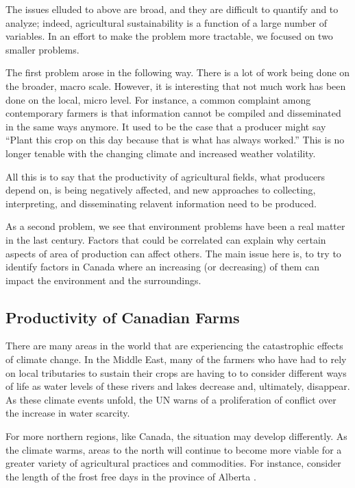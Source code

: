 \documentclass[11pt]{article}
\numberwithin{equation}{section}
\begin{document}
The issues elluded to above are broad, and they are difficult to quantify and to analyze; indeed, agricultural sustainability is a function of a large number of variables. In an effort to make the problem more tractable, we focused on two smaller problems.

The first problem arose in the following way. There is a lot of work being done on the broader, macro scale. However, it is interesting that not much work has been done on the local, micro level. For instance, a common complaint among contemporary farmers is that information cannot be compiled and disseminated in the same ways anymore. It used to be the case that a producer might say ``Plant this crop on this day because that is what has always worked.'' This is no longer tenable with the changing climate and increased weather volatility.

All this is to say that the productivity of agricultural fields, what producers depend on, is being negatively affected, and new approaches to collecting, interpreting, and disseminating relavent information need to be produced.

As a second problem, we see that environment problems  have been a real matter in the last century. Factors that could be correlated can explain why certain aspects of area of production can affect others. The main issue here is,  to try to identify  factors in  Canada where an increasing (or decreasing) of them can  impact the environment and the surroundings. 


\subsection{Productivity of Canadian Farms}\label{productivity}

There are many areas in the world that are experiencing the catastrophic effects of climate change. In the Middle East, many of the farmers who have had to rely on local tributaries to sustain their crops are having to to consider different ways of life as water levels of these rivers and lakes decrease and, ultimately, disappear. As these climate events unfold, the UN \cite{UN} warns of a proliferation of conflict over the increase in water scarcity.

For more northern regions, like Canada, the situation may develop differently. As the climate warms, areas to the north will continue to become more viable for a greater variety of agricultural practices and commodities. For instance, consider the length of the frost free days in the province of Alberta \cite{climate-data}.
\end{document}
